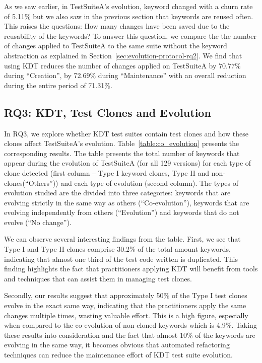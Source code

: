 As we saw earlier, in TestSuiteA's evolution, keyword changed with a churn rate of 5.11\% but we also saw in the previous section that keywords are reused often. This raises the questions: How many changes have been saved due to the reusability of the keywords? To answer this question, we compare the the number of changes applied to TestSuiteA to the same suite without the keyword abstraction as explained in Section~\ref{sec:evolution-protocol-rq2}. We find that using KDT reduces the number of changes applied on TestSuiteA by 70.77\% during ``Creation'', by 72.69\% during ``Maintenance'' with an overall reduction during the entire period of 71.31\%. 

\subsection{RQ3: KDT, Test Clones and Evolution}
\label{sec:evolution-results-rq3}

In RQ3, we explore whether KDT test suites contain test clones and how these clones affect TestSuiteA's evolution. Table~\ref{table:co_evolution} presents the corresponding results. The table presents the total number of keywords that appear during the evolution of TestSuiteA (for all 129 versions) for each type of clone detected (first column -- Type I keyword clones, Type II and non-clones(``Others'')) and each type of evolution (second column). The types of evolution studied are the divided into three categories: keywords that are evolving strictly in the same way as others (``Co-evolution''), keywords that are evolving independently from others (``Evolution'') and keywords that do not evolve (``No change'').

We can observe several interesting findings from the table. First, we see that Type I and Type II clones comprise 30.2\% of the total amount keywords, indicating that almost one third of the test code written is duplicated. This finding highlights the fact that practitioners applying KDT will benefit from tools and techniques that can assist them in managing test clones.

Secondly, our results suggest that approximately 50\% of the Type I test clones evolve in the exact same way, indicating that the practitioners apply the same changes multiple times, wasting valuable effort. This is a high figure, especially when compared to the co-evolution of non-cloned keywords which is 4.9\%. Taking these results into consideration and the fact that almost 10\% of the keywords are evolving in the same way, it becomes obvious that automated refactoring techniques can reduce the maintenance effort of KDT test suite evolution.

